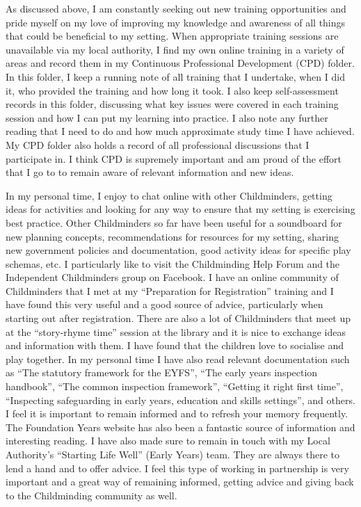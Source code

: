 \documentclass[10pt,a4paper]{report}
\begin{document}
As discussed above, I am constantly seeking out new training opportunities and pride myself on my love of improving my knowledge and awareness of all things that could be beneficial to my setting. 
When appropriate training sessions are unavailable via my local authority, I find my own online training in a variety of areas and record them in my Continuous Professional Development (CPD) folder. In this folder, I keep a running note of all training that I undertake, when I did it, who provided the training and how long it took. I also keep self-assessment records in this folder, discussing what key issues were covered in each training session and how I can put my learning into practice. I also note any further reading that I need to do and how much approximate study time I have achieved. My CPD folder also holds a record of all professional discussions that I participate in. I think CPD is supremely important and am proud of the effort that I go to to remain aware of relevant information and new ideas. 

In my personal time, I enjoy to chat online with other Childminders, getting ideas for activities and looking for any way to ensure that my setting is exercising best practice. Other Childminders so far have been useful for a soundboard for new planning concepts, recommendations for resources for my setting, sharing new government policies and documentation, good activity ideas for specific play schemas, etc. I particularly like to visit the Childminding Help Forum  and the Independent Childminders group on Facebook. I have an online community of Childminders that I met at my “Preparation for Registration” training and I have found this very useful and a good source of advice, particularly when starting out after registration. There are also a lot of Childminders that meet up at the “story-rhyme time” session at the library and it is nice to exchange ideas and information with them. I have found that the children love to socialise and play together. In my personal time I have also read relevant documentation such as “The statutory framework for the EYFS”, “The early years inspection handbook”, “The common inspection framework”, “Getting it right first time”, “Inspecting safeguarding in early years, education and skills settings”, and others. I feel it is important to remain informed and to refresh your memory frequently. The Foundation Years website has also been a fantastic source of information and interesting reading. I have also made sure to remain in touch with my Local Authority's “Starting Life Well” (Early Years) team. They are always there to lend a hand and to offer advice. I feel this type of working in partnership is very important and a great way of remaining informed, getting advice and giving back to the Childminding community as well.
\end{document}

